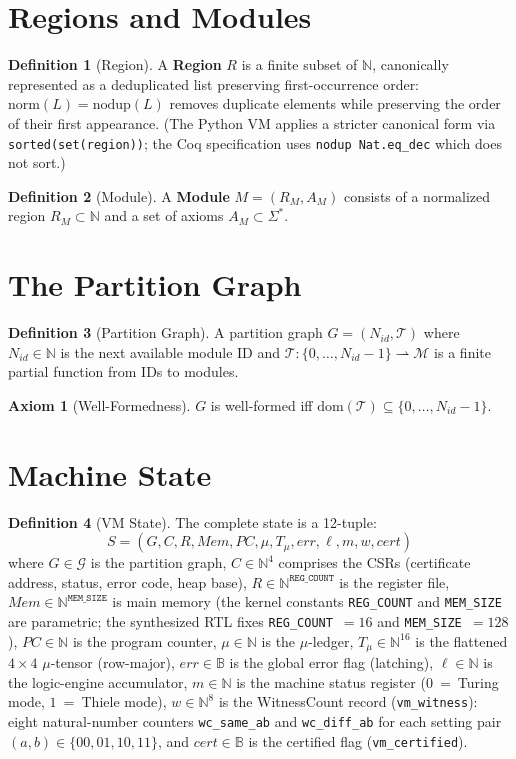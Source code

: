 \documentclass[11pt, a4paper]{report}
\theoremstyle{definition}
\newtheorem{definition}{Definition}[chapter]
\newtheorem{axiom}{Axiom}[chapter]
\theoremstyle{plain}
\newcommand{\N}{\mathbb{N}}
\newcommand{\B}{\mathbb{B}}
\newcommand{\Gspace}{\mathcal{G}}
\newcommand{\Mspace}{\mathcal{M}}
\begin{document}
\section{Regions and Modules}
\begin{definition}[Region]
A \textbf{Region} $R$ is a finite subset of $\N$, canonically represented as a deduplicated list preserving first-occurrence order: $\mathrm{norm}(L) = \mathrm{nodup}(L)$ removes duplicate elements while preserving the order of their first appearance. (The Python VM applies a stricter canonical form via \texttt{sorted(set(region))}; the Coq specification uses \texttt{nodup Nat.eq\_dec} which does not sort.)
\end{definition}

\begin{definition}[Module]
A \textbf{Module} $M = (R_M, A_M)$ consists of a normalized region $R_M \subset \N$ and a set of axioms $A_M \subset \Sigma^*$.
\end{definition}

\section{The Partition Graph}
\begin{definition}[Partition Graph]
A partition graph $G = (N_{id}, \mathcal{T})$ where $N_{id} \in \N$ is the next available module ID and $\mathcal{T}: \{0,\dots,N_{id}-1\} \rightharpoonup \Mspace$ is a finite partial function from IDs to modules.
\end{definition}

\begin{axiom}[Well-Formedness]
$G$ is well-formed iff $\mathrm{dom}(\mathcal{T}) \subseteq \{0,\dots,N_{id}-1\}$.
\end{axiom}

\section{Machine State}
\begin{definition}[VM State]
The complete state is a 12-tuple:
\[ S = (G, C, R, \mathit{Mem}, \mathit{PC}, \mu, T_\mu, \mathit{err}, \ell, m, w, \mathit{cert}) \]
where $G \in \Gspace$ is the partition graph, $C \in \N^4$ comprises the CSRs (certificate address, status, error code, heap base), $R \in \N^{\texttt{REG\_COUNT}}$ is the register file, $\mathit{Mem} \in \N^{\texttt{MEM\_SIZE}}$ is main memory (the kernel constants \texttt{REG\_COUNT} and \texttt{MEM\_SIZE} are parametric; the synthesized RTL fixes \texttt{REG\_COUNT}~$=16$ and \texttt{MEM\_SIZE}~$=128$), $\mathit{PC} \in \N$ is the program counter, $\mu \in \N$ is the $\mu$-ledger, $T_\mu \in \N^{16}$ is the flattened $4\times 4$ $\mu$-tensor (row-major), $\mathit{err} \in \B$ is the global error flag (latching), $\ell \in \N$ is the logic-engine accumulator, $m \in \N$ is the machine status register ($0$~=~Turing mode, $1$~=~Thiele mode), $w \in \N^8$ is the WitnessCount record (\texttt{vm\_witness}): eight natural-number counters \texttt{wc\_same\_ab} and \texttt{wc\_diff\_ab} for each setting pair $(a,b) \in \{00,01,10,11\}$, and $\mathit{cert} \in \B$ is the certified flag (\texttt{vm\_certified}).
\end{definition}
\end{document}
